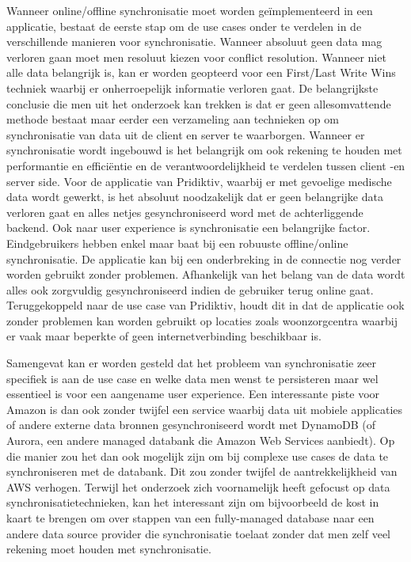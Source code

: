 Wanneer online/offline synchronisatie moet worden ge\"implementeerd in een applicatie,  bestaat de eerste stap om de use cases onder te verdelen in de verschillende manieren voor synchronisatie. Wanneer absoluut geen data mag verloren gaan moet men resoluut kiezen voor conflict resolution. Wanneer niet alle data belangrijk is, kan er worden geopteerd voor een First/Last Write Wins techniek waarbij er onherroepelijk informatie verloren gaat. De belangrijkste conclusie die men uit het onderzoek kan trekken is dat er geen allesomvattende methode bestaat maar eerder een verzameling aan technieken op om synchronisatie van data uit de client en server te waarborgen. Wanneer er  synchronisatie wordt ingebouwd is het belangrijk om ook rekening te houden met performantie en effici\"entie en de verantwoordelijkheid te verdelen tussen client -en server side. Voor de applicatie van Pridiktiv, waarbij er met gevoelige medische data wordt gewerkt, is het absoluut noodzakelijk dat er geen belangrijke data verloren gaat en alles netjes gesynchroniseerd word met de achterliggende backend. Ook naar user experience is synchronisatie een belangrijke factor. Eindgebruikers hebben enkel maar baat bij een robuuste offline/online synchronisatie. De applicatie kan bij een onderbreking in de connectie nog verder worden gebruikt zonder problemen. Afhankelijk van het belang van de data wordt alles ook zorgvuldig gesynchroniseerd indien de gebruiker terug online gaat. Teruggekoppeld naar de use case van Pridiktiv, houdt dit in dat de applicatie ook zonder problemen kan worden gebruikt op locaties zoals woonzorgcentra waarbij er vaak maar beperkte of geen internetverbinding beschikbaar is.

Samengevat kan er worden gesteld dat het probleem van synchronisatie zeer specifiek is aan de use case en welke data men wenst te persisteren maar wel essentieel is voor een aangename user experience. Een interessante piste voor Amazon is dan ook zonder twijfel een service waarbij data uit mobiele applicaties of andere externe data bronnen gesynchroniseerd wordt met DynamoDB (of Aurora, een andere managed databank die Amazon Web Services aanbiedt). Op die manier zou het dan ook mogelijk zijn om bij complexe use cases de data te synchroniseren met de databank. Dit zou zonder twijfel de aantrekkelijkheid van AWS verhogen. Terwijl het onderzoek zich voornamelijk heeft gefocust op data synchronisatietechnieken, kan het interessant zijn om bijvoorbeeld de kost in kaart te brengen om over stappen van een fully-managed database naar een andere data source provider die synchronisatie toelaat zonder dat men zelf veel rekening moet houden met synchronisatie.